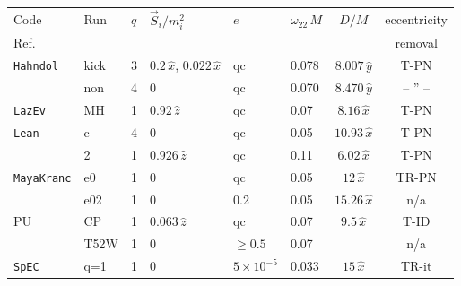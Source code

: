 \begin{table}
\begin{center}
\begin{tabular}{|l|l|l|l|l|l|c|c|}\hline
Code & Run & $q$ & $\vec S_i/m_i^2$ & $e$ & $\omega_{22}\, M$ & $D/M$ &
eccentricity
\\ 
\hfill Ref.     &     &   &                        &   &          &       &
     removal \\ \hline
{\tt Hahndol}      & kick   & 3 & $0.2\,\hat x$, $0.022\,\hat x$ & qc  &0.078 &  $8.007\,\hat{y}$ & T-PN \cite{Kidder:1995zr}\\ 
\hfill\cite{Imbiriba:2004tp,vanMeter:2006vi}            & non    & 4 & $0$     & qc
              &0.070 & $8.470\,\hat{y}$ & -- '' -- \\ %

{\tt LazEv}$\,$\cite{Zlochower:2005bj,Campanelli:2005dd}$\!$    & MH~\cite{Dain:2008ck} & 1 & $0.92\,\hat z$   & qc  &
0.07  & $8.16\,\hat x$ & T-PN \cite{Kidder:1995zr,Blanchet:1999pm} \\[1em]

{\tt Lean}\hfill\cite{Sperhake:2006cy}      &  c     & 4 & $0$       & qc  &
0.05  & $10.93\,\hat x$ & T-PN \cite{Brugmann:2008zz} \\ 
             &  2     & 1 & $0.926\,\hat z$   & qc  &
              0.11  & $6.02\,\hat x$ & T-PN \cite{Kidder:1995zr} \\[1em]

{\tt MayaKranc}     & e0  \cite{Hinder:2007qu}   & 1 & $0$       &  qc &
0.05 & $12\,\hat x$ & TR-PN \cite{Husa:2007rh} \\
  \hfill\cite{Vaishnav:2007nm}            & e02 \cite{Hinder:2007qu}   & 1 & $0$       & 0.2&
              0.05 & $15.26\,\hat x$ & n/a \\[1em]

PU\hfill\cite{Pretorius:2004jg,Pretorius:2005gq}  & CP \cite{Buonanno:2006ui}    & 1 & $0.063\,\hat z$      & qc  &
0.07  & $9.5\,\hat x$ & T-ID \cite{Cook:2004kt} \\
              & T52W \cite{Pretorius:2007jn}  & 1 & $0$       & $\ge
              0.5$ & 0.07 & & n/a \\[1em]

{\tt SpEC}\hfill  \cite{Scheel:2006gg}        & q=1 \cite{Boyle:2007ft,Scheel:2008rj}       & 1 & $0$       & $5\times 10^{-5}$  &
0.033 & $15\,\hat x$ & TR-it \cite{Pfeiffer:2007yz} \\[1em]


\end{tabular}
\end{center}
\end{table}
